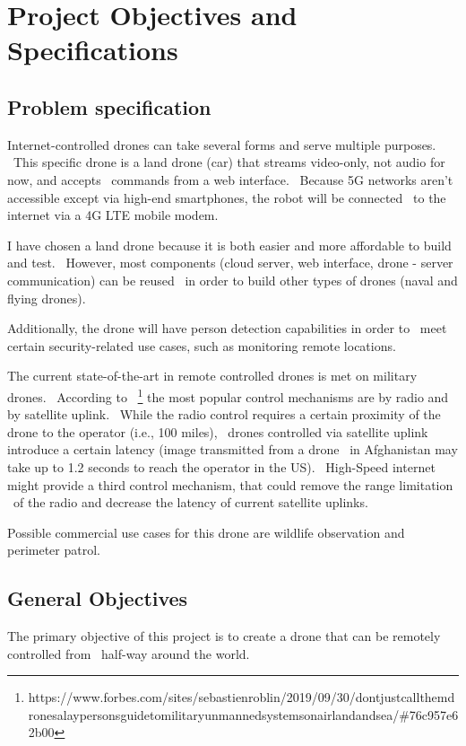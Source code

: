 

\chapter{Project Objectives and Specifications}
\label{ch:specification}

\section{Problem specification}
\label{sec:specification-specification}

Internet-controlled drones can take several forms and serve multiple purposes. \
This specific drone is a land drone (car) that streams video-only, not audio for now, and accepts \
commands from a web interface. \
Because 5G networks aren't accessible except via high-end smartphones, the robot will be connected \
to the internet via a 4G LTE mobile modem.

I have chosen a land drone because it is both easier and more affordable to build and test. \
However, most components (cloud server, web interface, drone - server communication) can be reused \
in order to build other types of drones (naval and flying drones).

Additionally, the drone will have person detection capabilities in order to \
meet certain security-related use cases, such as monitoring remote locations.

The current state-of-the-art in remote controlled drones is met on military drones. \
According to \
\footnote{https://www.forbes.com/sites/sebastienroblin/2019/09/30/dont\-just\-call\-them\-drones\-a\-laypersons\-guide\-to\-military\-unmanned\-systems\-on\-air\-land\-and\-sea/\#76c957e62b00}
the most popular control mechanisms are by radio and by satellite uplink. \
While the radio control requires a certain proximity of the drone to the operator (i.e., 100 miles), \
drones controlled via satellite uplink introduce a certain latency (image transmitted from a drone \
in Afghanistan may take up to 1.2 seconds to reach the operator in the US). \
High-Speed internet might provide a third control mechanism, that could remove the range limitation \
of the radio and decrease the latency of current satellite uplinks.

Possible commercial use cases for this drone are wildlife observation and perimeter patrol.


\section{General Objectives}
\label{sec:specification-objectives}
The primary objective of this project is to create a drone that can be remotely controlled from \
half-way around the world.

